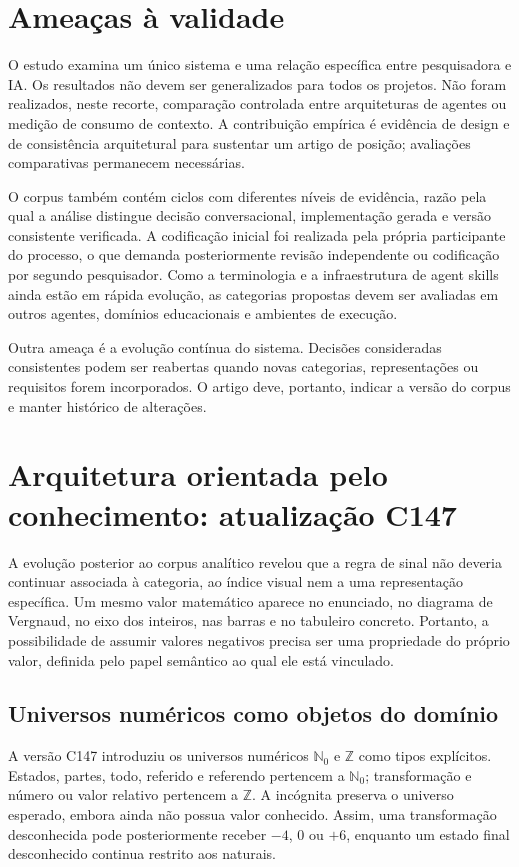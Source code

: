\documentclass[preprint,12pt,authoryear]{elsarticle}
\begin{document}
\section{Ameaças à validade}
O estudo examina um único sistema e uma relação específica entre pesquisadora e IA. Os resultados não devem ser generalizados para todos os projetos. Não foram realizados, neste recorte, comparação controlada entre arquiteturas de agentes ou medição de consumo de contexto. A contribuição empírica é evidência de design e de consistência arquitetural para sustentar um artigo de posição; avaliações comparativas permanecem necessárias.

O corpus também contém ciclos com diferentes níveis de evidência, razão pela qual a análise distingue decisão conversacional, implementação gerada e versão consistente verificada. A codificação inicial foi realizada pela própria participante do processo, o que demanda posteriormente revisão independente ou codificação por segundo pesquisador. Como a terminologia e a infraestrutura de agent skills ainda estão em rápida evolução, as categorias propostas devem ser avaliadas em outros agentes, domínios educacionais e ambientes de execução.

Outra ameaça é a evolução contínua do sistema. Decisões consideradas consistentes podem ser reabertas quando novas categorias, representações ou requisitos forem incorporados. O artigo deve, portanto, indicar a versão do corpus e manter histórico de alterações.


\section{Arquitetura orientada pelo conhecimento: atualização C147}

A evolução posterior ao corpus analítico revelou que a regra de sinal não deveria continuar associada à categoria, ao índice visual nem a uma representação específica. Um mesmo valor matemático aparece no enunciado, no diagrama de Vergnaud, no eixo dos inteiros, nas barras e no tabuleiro concreto. Portanto, a possibilidade de assumir valores negativos precisa ser uma propriedade do próprio valor, definida pelo papel semântico ao qual ele está vinculado.

\subsection{Universos numéricos como objetos do domínio}

A versão C147 introduziu os universos numéricos $\mathbb{N}_0$ e $\mathbb{Z}$ como tipos explícitos. Estados, partes, todo, referido e referendo pertencem a $\mathbb{N}_0$; transformação e número ou valor relativo pertencem a $\mathbb{Z}$. A incógnita preserva o universo esperado, embora ainda não possua valor conhecido. Assim, uma transformação desconhecida pode posteriormente receber $-4$, $0$ ou $+6$, enquanto um estado final desconhecido continua restrito aos naturais.
\end{document}
